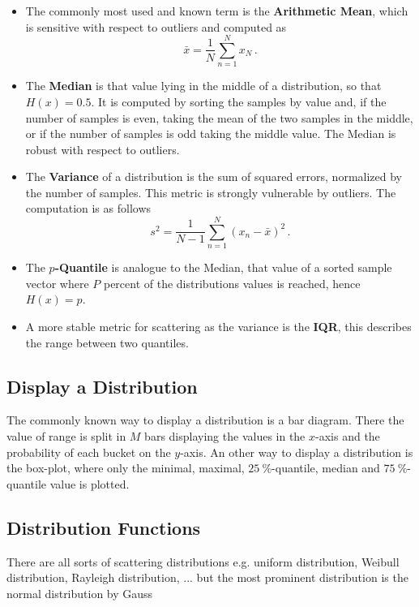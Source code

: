 \begin{itemize}
\item The commonly most used and known term is the \textbf{Arithmetic Mean}, which is sensitive with respect to outliers and computed as
\begin{equation}
\bar x = \frac{1}{N}\sum_{n=1}^N x_N\,.
\end{equation}
\item The \textbf{Median} is that value lying in the middle of a distribution, so that $H\left( x\right) = 0.5$. It is computed by sorting the samples by value and, if the number of samples is even, taking the mean of the two samples in the middle, or if the number of samples is odd taking the middle value. The Median is robust with respect to outliers.
\item The \textbf{Variance} of a distribution is the sum of squared errors, normalized by the number of samples. This metric is strongly vulnerable by outliers. The computation is as follows
\begin{equation}
s^2 = \frac{1}{N-1}\sum_{n=1}^N\left( x_n-\bar{x}\right)^2\,.
\end{equation}
\item The \textbf{$p$-Quantile} is analogue to the Median, that value of a sorted sample vector where $P$ percent of the distributions values is reached, hence $H\left( x\right) = p$.
\item A more stable metric for scattering as the variance is the \textbf{\ac{IQR}}, this describes the range between two quantiles.
\end{itemize}

\subsection{Display a Distribution}

The commonly known way to display a distribution is a bar diagram. There the value of range is split in $M$ bars displaying the values in the $x$-axis and the probability of each bucket on the $y$-axis. An other way to display a distribution is the box-plot, where only the minimal, maximal, $\SI{25}{\percent}$-quantile, median and $\SI{75}{\percent}$-quantile value is plotted.

\subsection{Distribution Functions}
There are all sorts of scattering distributions e.g. uniform distribution, Weibull distribution, Rayleigh distribution, ... but the most prominent distribution is the normal distribution by Gauss

